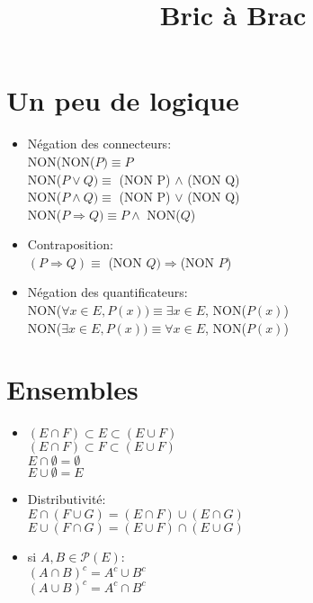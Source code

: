 \documentclass[fleqn]{article}
\title{Bric \`a Brac}
\date{}
\theoremstyle{definition} \newtheorem*{defi}{D\'efinition}
\theoremstyle{plain} \newtheorem*{theo}{Th\'eor\`eme}
\begin{document}
\maketitle

\section{Un peu de logique}
\begin{itemize}
	\item N\'egation des connecteurs: \\
		NON(NON(\(P) \equiv  P\) \\
		NON(\(P \lor Q) \equiv \) (NON P) \(\land\) (NON Q) \\
		NON(\(P \land Q) \equiv \) (NON P) \(\lor\) (NON Q) \\
		NON(\(P \Rightarrow Q) \equiv P \land\) NON(\(Q\))
	\item Contraposition: \\
		\((P \Rightarrow Q) \equiv\) (NON \(Q)\Rightarrow\)(NON \(P\))
	\item N\'egation des quantificateurs: \\
		NON(\(\forall x \in E, P(x)) \equiv \exists x \in E\), NON(\(P(x)\)) \\
		NON(\(\exists x \in E, P(x)) \equiv \forall x \in E\), NON(\(P(x)\))
\end{itemize}

\section{Ensembles}
\begin{itemize}
	\item $(E \cap F) \subset E \subset (E \cup F)$ \\
		$(E \cap F) \subset F \subset (E \cup F)$ \\
		$E \cap \emptyset = \emptyset$ \\
		$E \cup \emptyset = E$
	\item Distributivit\'e: \\
		\(E \cap(F \cup G) = (E \cap F) \cup (E \cap G)\) \\
		\(E \cup (F \cap G) = (E \cup F) \cap (E \cup G)\)
	\item si \(A, B \in \mathcal{P}(E)\): \\
		\((A \cap B)^c = A^c \cup B^c\) \\
		\((A \cup B)^c = A^c \cap B^c\)
\end{itemize}
\end{document}
